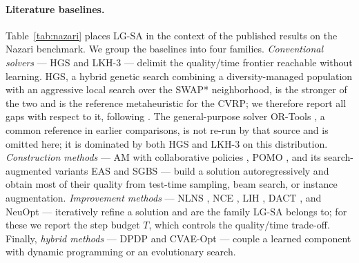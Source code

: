 \documentclass[letterpaper]{article} %
\begin{document}
\paragraph{Literature baselines.}
Table~\ref{tab:nazari} places LG-SA in the context of the published results on the Nazari benchmark. We group the baselines into four families. \emph{Conventional solvers} --- HGS \citep{vidal_hybrid_2022} and LKH-3 \citep{helsgaun_extension_2017} --- delimit the quality/time frontier reachable without learning. HGS, a hybrid genetic search combining a diversity-managed population with an aggressive local search over the SWAP* neighborhood, is the stronger of the two and is the reference metaheuristic for the CVRP; we therefore report all gaps with respect to it, following \citet{ma_learning_2023}. The general-purpose solver OR-Tools \citep{ortools_routing}, a common reference in earlier comparisons, is not re-run by that source and is omitted here; it is dominated by both HGS and LKH-3 on this distribution. \emph{Construction methods} --- AM \citep{kool_attention_2019} with collaborative policies \citep{kim_learning_2021}, POMO \citep{kwon_pomo_2021}, and its search-augmented variants EAS \citep{hottung_efficient_2021} and SGBS \citep{choo_simulation-guided_2022} --- build a solution autoregressively and obtain most of their quality from test-time sampling, beam search, or instance augmentation. \emph{Improvement methods} --- NLNS \citep{hottung_neural_2022}, NCE \citep{kim_learning_2021}, LIH \citep{wu_learning_2022}, DACT \citep{ma_learning_2021}, and NeuOpt \citep{ma_learning_2023} --- iteratively refine a solution and are the family LG-SA belongs to; for these we report the step budget $T$, which controls the quality/time trade-off. Finally, \emph{hybrid methods} --- DPDP \citep{kool_deep_2022} and CVAE-Opt \citep{hottung_learning_2021} --- couple a learned component with dynamic programming or an evolutionary search.
\end{document}
